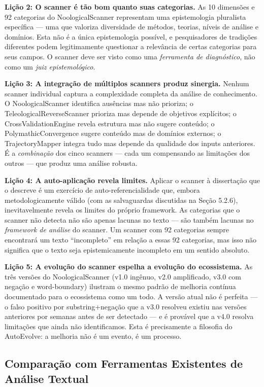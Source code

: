 \textbf{Lição 2: O scanner é tão bom quanto suas categorias.} As 10 dimensões e 92 categorias do NoologicalScanner representam uma epistemologia pluralista específica --- uma que valoriza diversidade de métodos, teorias, níveis de análise e domínios. Esta não é a única epistemologia possível, e pesquisadores de tradições diferentes podem legitimamente questionar a relevância de certas categorias para seus campos. O scanner deve ser visto como uma \textit{ferramenta de diagnóstico}, não como um \textit{juiz epistemológico}.

\textbf{Lição 3: A integração de múltiplos scanners produz sinergia.} Nenhum scanner individual captura a complexidade completa da análise de conhecimento. O NoologicalScanner identifica ausências mas não prioriza; o TeleologicalReverseScanner prioriza mas depende de objetivos explícitos; o CrossValidationEngine revela estrutura mas não sugere conteúdo; o PolymathicConvergence sugere conteúdo mas de domínios externos; o TrajectoryMapper integra tudo mas depende da qualidade dos inputs anteriores. É a \textit{combinação} dos cinco scanners --- cada um compensando as limitações dos outros --- que produz uma análise robusta.

\textbf{Lição 4: A auto-aplicação revela limites.} Aplicar o scanner à dissertação que o descreve é um exercício de auto-referencialidade que, embora metodologicamente válido (com as salvaguardas discutidas na Seção 5.2.6), inevitavelmente revela os limites do próprio framework. As categorias que o scanner não detecta não são apenas lacunas no texto --- são também lacunas no \textit{framework de análise} do scanner. Um scanner com 92 categorias sempre encontrará um texto ``incompleto'' em relação a essas 92 categorias, mas isso não significa que o texto seja epistemicamente incompleto em um sentido absoluto.

\textbf{Lição 5: A evolução do scanner espelha a evolução do ecossistema.} As três versões do NoologicalScanner (v1.0 ingênuo, v2.0 amplificado, v3.0 com negação e word-boundary) ilustram o mesmo padrão de melhoria contínua documentado para o ecossistema como um todo. A versão atual não é perfeita --- o falso positivo por substring+negação que a v3.0 resolveu existiu nas versões anteriores por semanas antes de ser detectado --- e é provável que a v4.0 resolva limitações que ainda não identificamos. Esta é precisamente a filosofia do AutoEvolve: a melhoria não é um evento, é um processo.

\subsection{Comparação com Ferramentas Existentes de Análise Textual}

